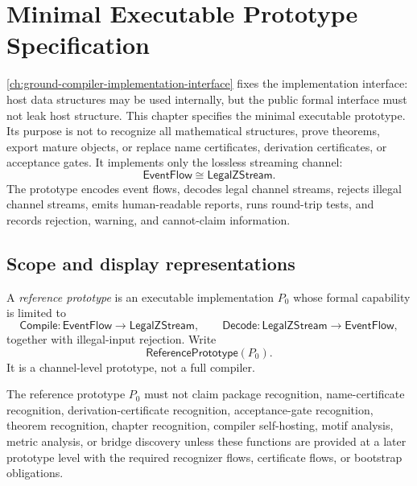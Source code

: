 \chapter{Minimal Executable Prototype Specification}
\label{ch:ground-compiler-minimal-executable-prototype}

\autoref{ch:ground-compiler-implementation-interface} fixes the implementation interface: host data structures may be used internally, but the public formal interface must not leak host structure. This chapter specifies the minimal executable prototype. Its purpose is not to recognize all mathematical structures, prove theorems, export mature objects, or replace name certificates, derivation certificates, or acceptance gates. It implements only the lossless streaming channel:
$$
  \mathsf{EventFlow}\cong\mathsf{LegalZStream}.
$$
The prototype encodes event flows, decodes legal channel streams, rejects illegal channel streams, emits human-readable reports, runs round-trip tests, and records rejection, warning, and cannot-claim information.

\section{Scope and display representations}
\label{sec:minimal-prototype-scope-display}

\begin{definition}
\label{def:minimal-prototype-reference}
A \emph{reference prototype} is an executable implementation $P_0$ whose formal capability is limited to
$$
  \mathsf{Compile}:\mathsf{EventFlow}\to\mathsf{LegalZStream},
  \qquad
  \mathsf{Decode}:\mathsf{LegalZStream}\to\mathsf{EventFlow},
$$
together with illegal-input rejection. Write
$$
  \mathsf{ReferencePrototype}(P_0).
$$
It is a channel-level prototype, not a full compiler.
\end{definition}

\begin{principle}
\label{prin:minimal-prototype-not-full-compiler}
The reference prototype $P_0$ must not claim package recognition, name-certificate recognition, derivation-certificate recognition, acceptance-gate recognition, theorem recognition, chapter recognition, compiler self-hosting, motif analysis, metric analysis, or bridge discovery unless these functions are provided at a later prototype level with the required recognizer flows, certificate flows, or bootstrap obligations.
\end{principle}

